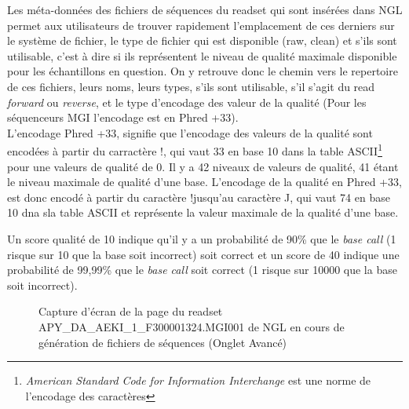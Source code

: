 Les méta-données des fichiers de séquences du readset qui sont insérées dans NGL permet aux utilisateurs de trouver rapidement l'emplacement de ces derniers sur le système de fichier, le type de fichier qui est disponible (\og raw\fg{}, \og clean\fg{}) et s'ils sont \og utilisable\fg{}, c'est à dire si ils représentent le niveau de qualité maximale disponible pour les échantillons en question.
On y retrouve donc le chemin vers le repertoire de ces fichiers, leurs noms, leurs types, s'ils sont utilisable, s'il s'agit du read \emph{forward} ou \emph{reverse}, et le type d'encodage des valeur de la qualité (Pour les séquenceurs MGI l'encodage est en Phred +33).\\

L'encodage Phred +33, signifie que l'encodage des valeurs de la qualité sont encodées à partir du carractère \og !\fg{}, qui vaut 33 en base 10 dans la table ASCII\footnote{\emph{American Standard Code for Information Interchange} est une norme de l'encodage des caractères} pour une valeurs de qualité de 0. Il y a 42 niveaux de valeurs de qualité, 41 étant le niveau maximale de qualité d'une base. L'encodage de la qualité en Phred +33, est donc encodé à partir du caractère \og !\fg jusqu'au caractère \og J\fg{}, qui vaut 74 en base 10 dna sla table ASCII et représente la valeur maximale de la qualité d'une base.

Un score qualité de 10 indique qu'il y a un probabilité de 90\% que le \emph{base call} (1 risque sur 10 que la base soit incorrect) soit correct et un score de 40 indique une probabilité de 99,99\% que le \emph{base call} soit correct (1 risque sur 10000 que la base soit incorrect).

\begin{figure}[H]
    \centering
    \caption{\footnotesize{Capture d'écran de la page du readset APY\_DA\_AEKI\_1\_F300001324.MGI001 de NGL en cours de génération de fichiers de séquences (Onglet \og Avancé\fg{})}}
    \label{meta-data-fastq}
\end{figure}

